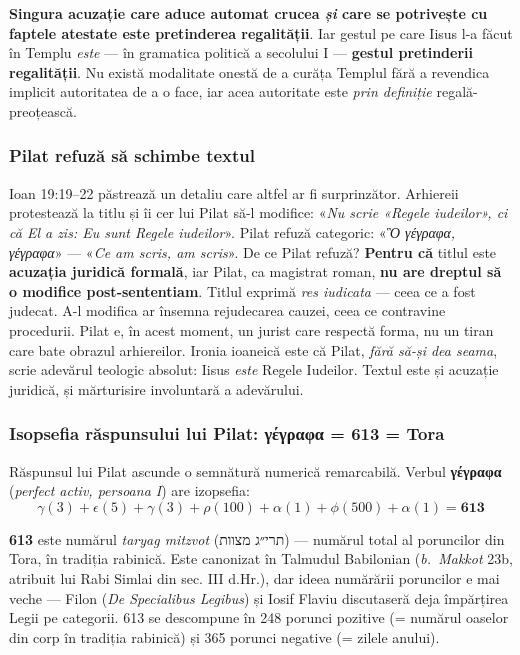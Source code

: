 \documentclass[12pt,a4paper,twoside,openany]{book}
\begin{document}
\textbf{Singura acuzație care aduce automat crucea \textit{și} care se potrivește cu faptele atestate este pretinderea regalității}. Iar gestul pe care Iisus l-a făcut în Templu \textit{este} — în gramatica politică a secolului I — \textbf{gestul pretinderii regalității}. Nu există modalitate onestă de a curăța Templul fără a revendica implicit autoritatea de a o face, iar acea autoritate este \textit{prin definiție} regală-preoțească.

\subsubsection*{Pilat refuză să schimbe textul}

Ioan 19:19--22 păstrează un detaliu care altfel ar fi surprinzător. Arhiereii protestează la titlu și îi cer lui Pilat să-l modifice: «\textit{Nu scrie «Regele iudeilor», ci că El a zis: Eu sunt Regele iudeilor}». Pilat refuză categoric: «\textit{Ὃ γέγραφα, γέγραφα}» — «\textit{Ce am scris, am scris}». De ce Pilat refuză? \textbf{Pentru că} titlul este \textbf{acuzația juridică formală}, iar Pilat, ca magistrat roman, \textbf{nu are dreptul să o modifice post-sententiam}. Titlul exprimă \textit{res iudicata} — ceea ce a fost judecat. A-l modifica ar însemna rejudecarea cauzei, ceea ce contravine procedurii. Pilat e, în acest moment, un jurist care respectă forma, nu un tiran care bate obrazul arhiereilor. Ironia ioaneică este că Pilat, \textit{fără să-și dea seama}, scrie adevărul teologic absolut: Iisus \textit{este} Regele Iudeilor. Textul este și acuzație juridică, și mărturisire involuntară a adevărului.

\subsubsection*{Isopsefia răspunsului lui Pilat: γέγραφα = 613 = Tora}

Răspunsul lui Pilat ascunde o semnătură numerică remarcabilă. Verbul \textbf{γέγραφα} (\textit{perfect activ, persoana I}) are izopsefia:
\[
\gamma(3) + \epsilon(5) + \gamma(3) + \rho(100) + \alpha(1) + \phi(500) + \alpha(1) = \mathbf{613}
\]

\textbf{613} este numărul \textit{taryag mitzvot} (תרי״ג מצוות) — numărul total al poruncilor din Tora, în tradiția rabinică. Este canonizat în Talmudul Babilonian (\textit{b.\ Makkot} 23b, atribuit lui Rabi Simlai din sec. III d.Hr.), dar ideea numărării poruncilor e mai veche — Filon (\textit{De Specialibus Legibus}) și Iosif Flaviu discutaseră deja împărțirea Legii pe categorii. 613 se descompune în 248 porunci pozitive (= numărul oaselor din corp în tradiția rabinică) și 365 porunci negative (= zilele anului).
\end{document}
